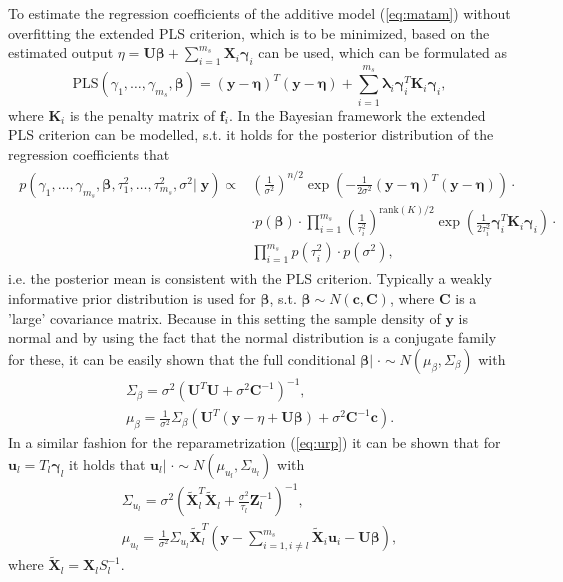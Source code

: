 \documentclass[12pt,letterpaper]{article}
\numberwithin{equation}{subsection}
\begin{document}
To estimate the regression coefficients of the additive model (\ref{eq:matam}) without overfitting the extended PLS criterion, which is to be minimized, based on the estimated output $\eta = \mathbf{U}\mathbf{\beta} +  \sum^{m_s}_{i=1} \mathbf{X}_i\mathbf{\gamma}_i$
can be used, which can be formulated as
\begin{equation}
\text{PLS}(\gamma_1,\dots ,\gamma_{m_s},\mathbf{\beta}) = (\mathbf{y} - \mathbf{\eta})^T(\mathbf{y} - \mathbf{\eta}) + \sum^{m_s}_{i=1} \mathbf{\lambda}_i\mathbf{\gamma}_i^T\mathbf{K}_i\mathbf{\gamma}_i,
\end{equation}
where $\mathbf{K}_i$ is the penalty matrix of $\mathbf{f}_i$. In the Bayesian framework the extended PLS criterion can be modelled, s.t. it holds for the posterior distribution of the regression coefficients that 
\begin{align}
\begin{split}
p(\gamma_1,\dots ,\gamma_{m_s},\mathbf{\beta},\tau^2_1,\dots,\tau^2_{m_s},\sigma^2| \; \mathbf{y}) \propto &
(\frac{1}{\sigma^2})^{n/2}\exp(-\frac{1}{2\sigma^2}(\mathbf{y} - \mathbf{\eta})^T(\mathbf{y} - \mathbf{\eta})) \cdot \\
& \cdot p(\mathbf{\beta}) \cdot \prod^{m_s}_{i=1}(\frac{1}{\tau^2_i})^{\text{rank}(K)/2}\exp(\frac{1}{2\tau_i^2}\mathbf{\gamma}_i^T\mathbf{K}_i\mathbf{\gamma}_i) \cdot \\
& \prod^{m_s}_{i=1}  p(\tau^2_i)  \cdot  p(\sigma^2),
\end{split}
\end{align}
i.e. the posterior mean is consistent with the PLS criterion. Typically a weakly informative prior distribution is used for $\mathbf{\beta}$, s.t. $\mathbf{\beta} \sim N(\mathbf{c},\mathbf{C})$, where $\mathbf{C}$ is a 'large' covariance matrix. Because in this setting the sample density of $\mathbf{y}$ is normal and by using the fact that the normal distribution is a conjugate family for these, it can be easily shown that the full conditional $\mathbf{\beta} |\; \cdot \sim N(\mu_\beta, \Sigma_\beta)$ with
\begin{align}
\Sigma_\beta = \sigma^2(\mathbf{U}^T\mathbf{U} + \sigma^2 \mathbf{C}^{-1})^{-1}, \\
\mu_\beta = \frac{1}{\sigma^2}\Sigma_\beta(\mathbf{U}^T(\mathbf{y} - \eta + \mathbf{U}\mathbf{\beta}) + \sigma^2\mathbf{C}^{-1}\mathbf{c}).
\label{eq:mubeta}
\end{align}
In a similar fashion for the reparametrization (\ref{eq:urp}) it can be shown that for $\mathbf{u}_l = T_l\mathbf{\gamma}_l$ it holds that $\mathbf{u}_l |\; \cdot \sim N(\mu_{u_l}, \Sigma_{u_l})$ with
\begin{align}
\Sigma_{u_l} = \sigma^2(\tilde{\mathbf{X}}_l^T\tilde{\mathbf{X}}_l + \frac{\sigma^2}{\tau_l} \mathbf{Z}_l^{-1})^{-1}, \\
\mu_{u_l} = \frac{1}{\sigma^2}\Sigma_{u_l}\tilde{\mathbf{X}}_l^T(\mathbf{y} - \sum^{m_s}_{i=1,i\neq l} \tilde{\mathbf{X}}_i\mathbf{u}_i - \mathbf{U}\mathbf{\beta}),
\label{eq:muU}
\end{align}
where $\tilde{\mathbf{X}}_l = \mathbf{X}_lS^{-1}_l$.
\label{sec:AddMod}
\pagebreak
\end{document}
